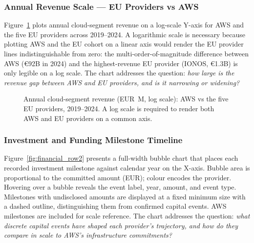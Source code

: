 \subsubsection{Annual Revenue Scale — EU Providers vs AWS}
\label{subsubsec:chart_revenue}

Figure~\ref{fig:financial_row1_right} plots annual cloud-segment revenue on a log-scale Y-axis for AWS and the five EU providers across 2019--2024. A logarithmic scale is necessary because plotting AWS and the EU cohort on a linear axis would render the EU provider lines indistinguishable from zero: the multi-order-of-magnitude difference between AWS (€92B in 2024) and the highest-revenue EU provider (IONOS, €1.3B) is only legible on a log scale. The chart addresses the question: \emph{how large is the revenue gap between AWS and EU providers, and is it narrowing or widening?}

\begin{figure}[htbp]
  \centering
  \caption{Annual cloud-segment revenue (EUR~M, log scale): AWS vs the five EU providers, 2019--2024. A log scale is required to render both AWS and EU providers on a common axis.}
  \label{fig:financial_row1_right}
\end{figure}

\subsubsection{Investment and Funding Milestone Timeline}
\label{subsubsec:chart_milestones}

Figure~\ref{fig:financial_row2} presents a full-width bubble chart that places each recorded investment milestone against calendar year on the X-axis. Bubble area is proportional to the committed amount (EUR); colour encodes the provider. Hovering over a bubble reveals the event label, year, amount, and event type. Milestones with undisclosed amounts are displayed at a fixed minimum size with a dashed outline, distinguishing them from confirmed capital events. AWS milestones are included for scale reference. The chart addresses the question: \emph{what discrete capital events have shaped each provider's trajectory, and how do they compare in scale to AWS's infrastructure commitments?}

